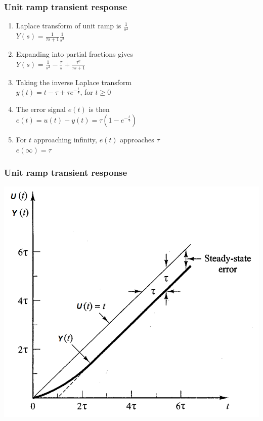 \begin{frame}
\frametitle{Unit ramp transient response}
\begin{enumerate}
\vspace{0.2cm}
\item Laplace transform of unit ramp is $\frac{1}{s^2}$
\vspace{0.1cm}
\\ $Y(s) = \frac{1}{\tau s +1} \frac{1}{s^2}$
\vspace{0.2cm}
\item Expanding into partial fractions gives
\vspace{0.1cm}
\\ $Y(s)= \frac{1}{s^2} - \frac{\tau}{s} + \frac{\tau^2}{\tau s +1}$
\vspace{0.2cm}
\item Taking the inverse Laplace transform 
\vspace{0.1cm}
\\ $y(t) = t -\tau + \tau e^{-\frac{t}{\tau}}$, for $t\ge 0$
\vspace{0.2cm}
\item The error signal $e(t)$ is then
\vspace{0.1cm}
\\ $e(t)=u(t) -y(t) = \tau(1-e^{-\frac{t}{\tau}})$
\vspace{0.2cm}
\item For $t$ approaching infinity, $e(t)$ approaches $\tau$
\vspace{0.1cm}
\\ $e(\infty) = \tau$
\end {enumerate}
\end{frame}

\begin{frame}
\frametitle{Unit ramp transient response}
\includegraphics[width=0.6\linewidth]{Afbeelding4}
\end{frame}

